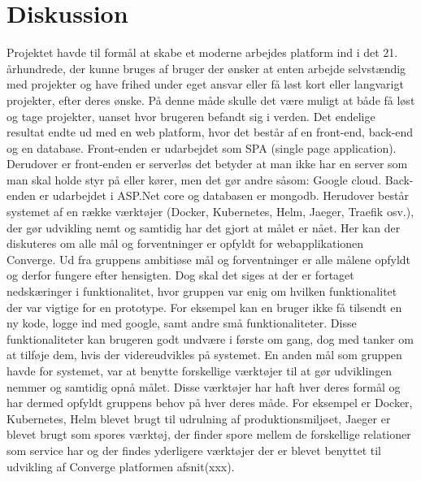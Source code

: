 \chapter{Diskussion}
\label{cha:discussion}

Projektet havde til formål at skabe et moderne arbejdes platform ind i det 21. århundrede, der kunne bruges af bruger der ønsker at enten arbejde selvstændig med projekter og have frihed under eget ansvar eller få løst kort eller langvarigt projekter, efter deres ønske. På denne måde skulle det være muligt at både få løst og tage projekter, uanset hvor brugeren befandt sig i verden. Det endelige resultat endte ud med en web platform, hvor det består af en front-end, back-end og en database.  Front-enden er udarbejdet som SPA (single page application). Derudover er front-enden er serverløs det betyder at man ikke har en server som man skal holde styr på eller kører, men det gør andre såsom: Google cloud. Back-enden er udarbejdet i ASP.Net core og databasen er mongodb. Herudover består systemet af en række værktøjer (Docker, Kubernetes, Helm, Jaeger, Traefik osv.), der gør udvikling nemt og samtidig har det gjort at målet er nået. 
Her kan der diskuteres om alle mål og forventninger er opfyldt for webapplikationen Converge. Ud fra gruppens ambitiøse mål og forventninger er alle målene opfyldt og derfor fungere efter hensigten. Dog skal det siges at der er fortaget nedskæringer i funktionalitet, hvor gruppen var enig om hvilken funktionalitet der var vigtige for en prototype. For eksempel kan en bruger ikke få tilsendt en ny kode, logge ind med google, samt andre små funktionaliteter. Disse funktionaliteter kan brugeren godt undvære i første om gang, dog med tanker om at tilføje dem, hvis der videreudvikles på systemet. 
En anden mål som gruppen havde for systemet, var at benytte forskellige værktøjer til at gør udviklingen nemmer og samtidig opnå målet. Disse værktøjer har haft hver deres formål og har dermed opfyldt gruppens behov på hver deres måde. For eksempel er Docker, Kubernetes, Helm blevet brugt til udrulning af produktionsmiljøet, Jaeger er blevet brugt som spores værktøj, der finder spore mellem de forskellige relationer som service har og der findes yderligere værktøjer der er blevet benyttet til udvikling af Converge platformen afsnit(xxx). 


